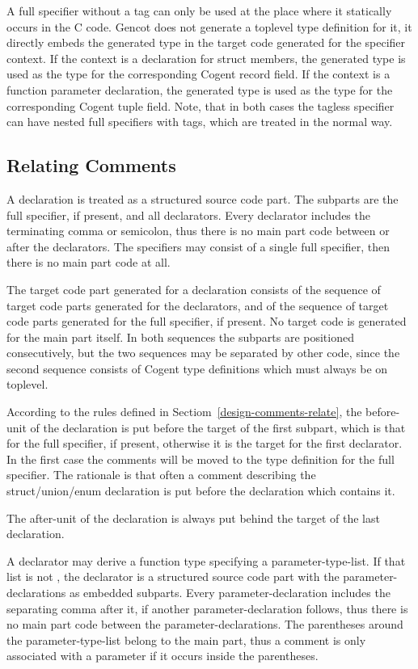 A full specifier without a tag can only be used at the place where it statically occurs in the C code.
Gencot does not generate a toplevel type definition for it, it directly embeds the generated type in the target code 
generated for the specifier context. If the context is a declaration for struct members, the generated type is used
as the type for the corresponding Cogent record field. If the context is a function parameter declaration, the
generated type is used as the type for the corresponding Cogent tuple field. Note, that in both cases the tagless
specifier can have nested full specifiers with tags, which are treated in the normal way.

\subsection{Relating Comments}

A declaration is treated as a structured source code part. The subparts are the full specifier, if present, and all
declarators. Every declarator includes the terminating comma or semicolon, thus there is no main part code between or after
the declarators. The specifiers may consist of a single full specifier, then there is no main part code at all.

The target code part generated for a declaration consists of the sequence of target code parts generated for the declarators,
and of the sequence of target code parts generated for the full specifier, if present. No target code is generated for the 
main part itself. In both sequences the subparts are 
positioned consecutively, but the two sequences may be separated by other code, since the second sequence consists of 
Cogent type definitions which must always be on toplevel. 

According to the rules defined in Sectiom~\ref{design-comments-relate}, the before-unit of the declaration is put before
the target of the first subpart, which is that for the full specifier, if present, otherwise it is the target for the
first declarator. In the first case the comments will be moved to the type definition for the full specifier. The rationale
is that often a comment describing the struct/union/enum declaration is put before the declaration which contains it.

The after-unit of the declaration is always put behind the target of the last declaration.

A declarator may derive a function type specifying a parameter-type-list. If that list is not , the 
declarator is a structured source code part with the parameter-declarations as embedded subparts. Every
parameter-declaration includes the separating comma after it, if another parameter-declaration follows,
thus there is no main part code between the parameter-declarations. The parentheses around the parameter-type-list
belong to the main part, thus a comment is only associated with a parameter if it occurs inside the parentheses.

